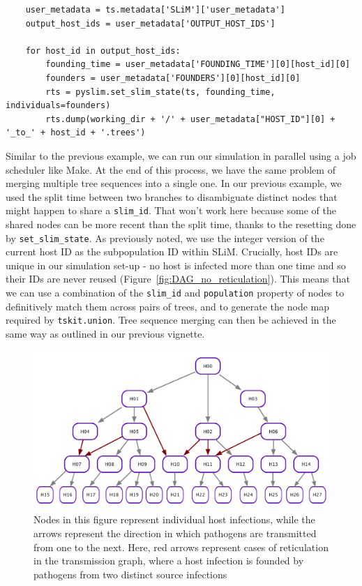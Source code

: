 \documentclass[12pt]{article}
\begin{document}
\begin{verbatim}
    user_metadata = ts.metadata['SLiM']['user_metadata']
    output_host_ids = user_metadata['OUTPUT_HOST_IDS']

    for host_id in output_host_ids:
        founding_time = user_metadata['FOUNDING_TIME'][0][host_id][0]
        founders = user_metadata['FOUNDERS'][0][host_id][0]
        rts = pyslim.set_slim_state(ts, founding_time, individuals=founders)
        rts.dump(working_dir + '/' + user_metadata["HOST_ID"][0] + '_to_' + host_id + '.trees')
\end{verbatim}

Similar to the previous example, we can run our simulation in parallel using a job scheduler like Make. %
At the end of this process, we have the same problem of merging multiple tree sequences into a single one.
In our previous example, we used the split time between two branches
to disambiguate distinct nodes that might happen to share a \verb|slim_id|.
That won't work here because some of the shared nodes can be more recent than the split time,
thanks to the resetting done by \verb|set_slim_state|.
As previously noted, we use the integer version of the current host ID as the subpopulation ID within SLiM.
Crucially, host IDs are unique in our simulation set-up - no host is infected more than
one time and so their IDs are never reused  (Figure~\ref{fig:DAG_no_reticulation}). This means that we can use a combination of the \verb|slim_id| and \verb|population| property of nodes to
definitively match them across pairs of trees, and to generate the node map required by \verb|tskit.union|.
Tree sequence merging can then be achieved in the same way as outlined
in our previous vignette. %

\begin{figure}[h!]
    \centering
     \includegraphics[width=\textwidth]{figures/DAG_w_reticulation.pdf}
     \caption{
        Nodes in this figure represent individual host infections, while the arrows represent the direction in which pathogens are transmitted from one to the next. Here, red arrows represent cases of reticulation in the transmission graph, where a host infection is founded by pathogens from two distinct source infections
     \label{fig:DAG_w_reticulation}
     }
    \end{figure}
\end{document}

